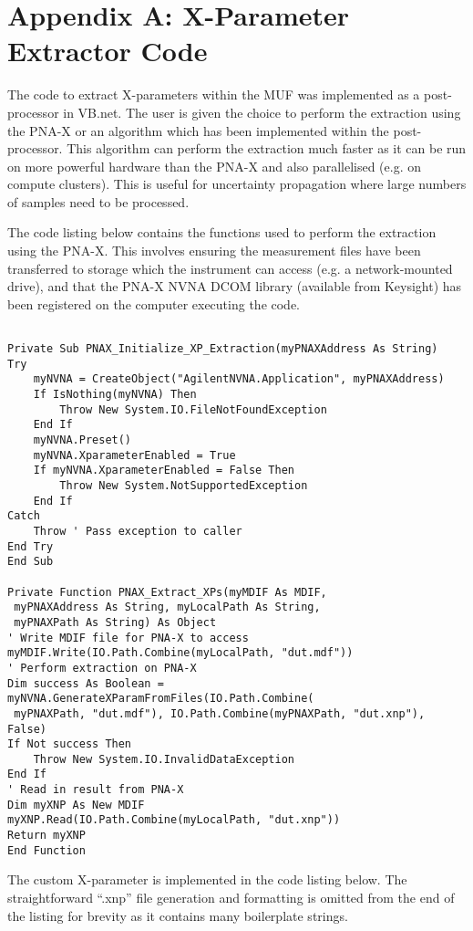 \documentclass[../thesis/thesis.tex]{subfiles}
\begin{document}
\chapter*{Appendix A: X-Parameter Extractor Code}
The code to extract X-parameters within the MUF was implemented as a post-processor in VB.net. The user is given the choice to perform the extraction using the PNA-X or an algorithm which has been implemented within the post-processor. This algorithm can perform the extraction much faster as it can be run on more powerful hardware than the PNA-X and also parallelised (e.g. on compute clusters). This is useful for uncertainty propagation where large numbers of samples need to be processed.

The code listing below contains the functions used to perform the extraction using the PNA-X. This involves ensuring the measurement files have been transferred to storage which the instrument can access (e.g. a network-mounted drive), and that the PNA-X NVNA DCOM library (available from Keysight) has been registered on the computer executing the code.

\begin{lstlisting}[language=vbscript]

Private Sub PNAX_Initialize_XP_Extraction(myPNAXAddress As String)
Try
	myNVNA = CreateObject("AgilentNVNA.Application", myPNAXAddress)
	If IsNothing(myNVNA) Then
		Throw New System.IO.FileNotFoundException
	End If
	myNVNA.Preset()
	myNVNA.XparameterEnabled = True
	If myNVNA.XparameterEnabled = False Then
		Throw New System.NotSupportedException
	End If
Catch
	Throw ' Pass exception to caller
End Try
End Sub

Private Function PNAX_Extract_XPs(myMDIF As MDIF, 
 myPNAXAddress As String, myLocalPath As String, 
 myPNAXPath As String) As Object
' Write MDIF file for PNA-X to access
myMDIF.Write(IO.Path.Combine(myLocalPath, "dut.mdf"))
' Perform extraction on PNA-X
Dim success As Boolean = myNVNA.GenerateXParamFromFiles(IO.Path.Combine(
 myPNAXPath, "dut.mdf"), IO.Path.Combine(myPNAXPath, "dut.xnp"), False)
If Not success Then
	Throw New System.IO.InvalidDataException
End If
' Read in result from PNA-X
Dim myXNP As New MDIF
myXNP.Read(IO.Path.Combine(myLocalPath, "dut.xnp"))
Return myXNP
End Function
\end{lstlisting}

The custom X-parameter is implemented in the code listing below. The straightforward ``.xnp'' file generation and formatting is omitted from the end of the listing for brevity as it contains many boilerplate strings.
\end{document}
